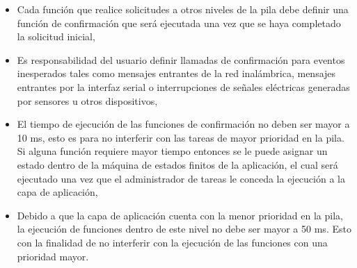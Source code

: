 \begin{itemize}
	\item Cada función que realice solicitudes a otros niveles de la pila debe definir una función de confirmación que será ejecutada una vez que se haya completado la solicitud inicial, 
	\item Es responsabilidad del usuario definir llamadas de confirmación para eventos inesperados tales como mensajes entrantes de la red inalámbrica, mensajes entrantes por la interfaz serial o interrupciones de señales eléctricas generadas por sensores u otros dispositivos,  
	\item El tiempo de ejecución de las funciones de confirmación no deben ser mayor a 10 ms, esto es para no interferir con las tareas de mayor prioridad en la pila. Si alguna función requiere mayor tiempo entonces se le puede asignar un estado dentro de la máquina de estados finitos de la aplicación, el cual será ejecutado una vez que el administrador de tareas le conceda la ejecución a la capa de aplicación, 
	\item Debido a que la capa de aplicación cuenta con la menor prioridad en la pila, la ejecución de funciones dentro de este nivel no debe ser mayor a 50 ms. Esto con la finalidad de no interferir con la ejecución de las funciones con una prioridad mayor. 
\end{itemize}


